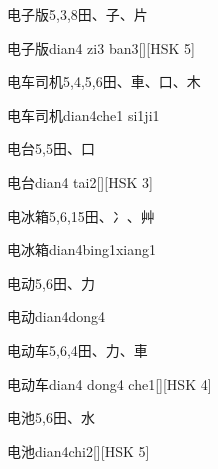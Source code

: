 \begin{entry}{电子版}{5,3,8}{⽥、⼦、⽚}
  \begin{phonetics}{电子版}{dian4 zi3 ban3}[][HSK 5]
  \end{phonetics}
\end{entry}

\begin{entry}{电车司机}{5,4,5,6}{⽥、⾞、⼝、⽊}
  \begin{phonetics}{电车司机}{dian4che1 si1ji1}
  \end{phonetics}
\end{entry}

\begin{entry}{电台}{5,5}{⽥、⼝}
  \begin{phonetics}{电台}{dian4 tai2}[][HSK 3]
  \end{phonetics}
\end{entry}

\begin{entry}{电冰箱}{5,6,15}{⽥、⼎、⾋}
  \begin{phonetics}{电冰箱}{dian4bing1xiang1}
  \end{phonetics}
\end{entry}

\begin{entry}{电动}{5,6}{⽥、⼒}
  \begin{phonetics}{电动}{dian4dong4}
  \end{phonetics}
\end{entry}

\begin{entry}{电动车}{5,6,4}{⽥、⼒、⾞}
  \begin{phonetics}{电动车}{dian4 dong4 che1}[][HSK 4]
  \end{phonetics}
\end{entry}

\begin{entry}{电池}{5,6}{⽥、⽔}
  \begin{phonetics}{电池}{dian4chi2}[][HSK 5]
  \end{phonetics}
\end{entry}

